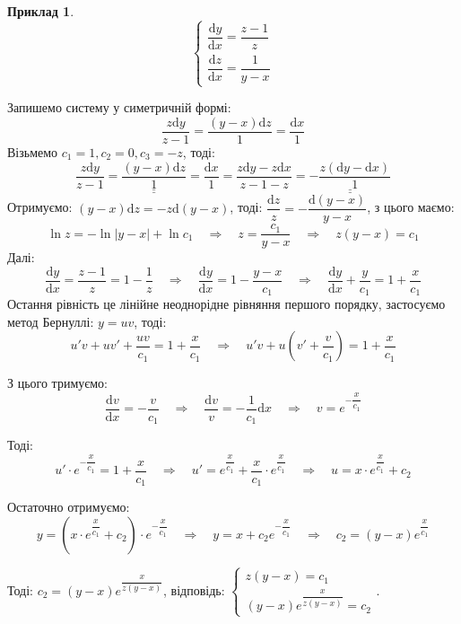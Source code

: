 \documentclass[14pt,a4paper]{scrartcl}
\theoremstyle{definition}
\newtheorem*{example}{Приклад}
\theoremstyle{definition}
\theoremstyle{definition}
\def\doubleunderline#1{\underline{\underline{#1}}}
\begin{document}
\begin{example}
  \begin{equation*}
    \begin{cases}
      \dfrac{\mathrm{d}y}{\mathrm{d}x} = \dfrac{z - 1}{z} \\
      \dfrac{\mathrm{d}z}{\mathrm{d}x} = \dfrac{1}{y - x}
    \end{cases}
  \end{equation*}
\end{example}
Запишемо систему у симетричній формі: $$ \dfrac{z\mathrm{d}y}{z - 1} = \dfrac{(y-x)\mathrm{d}z}{1} = \dfrac{\mathrm{d}x}{1}$$
Візьмемо $c_1 = 1, c_2 = 0, c_3 = -z$, тоді: $$\dfrac{z\mathrm{d}y}{z - 1} = \doubleunderline{\dfrac{(y - x)\mathrm{d}z}{1}} = \dfrac{\mathrm{d}x}{1} = \dfrac{z\mathrm{d}y - z\mathrm{d}x}{z - 1 - z} = \doubleunderline{-\dfrac{z(\mathrm{d}y - \mathrm{d}x)}{1}}$$
Отримуємо: $(y - x)\mathrm{d}z = -z\mathrm{d}(y - x)$, тоді: $\dfrac{\mathrm{d}z}{z} = - \dfrac{\mathrm{d}(y - x)}{y -x}$, з цього маємо: $$ \ln z = - \ln|y - x| + \ln c_1 \quad \Longrightarrow \quad z = \dfrac{c_1}{y - x} \quad \Longrightarrow \quad z (y - x) = c_1$$
Далі: $$ \dfrac{\mathrm{d}y}{\mathrm{d}x} = \dfrac{z - 1}{z} = 1 - \dfrac{1}{z} \quad \Longrightarrow \quad \dfrac{\mathrm{d}y}{\mathrm{d}x} = 1 - \dfrac{y - x}{c_1} \quad \Longrightarrow \quad \dfrac{\mathrm{d}y}{\mathrm{d}x} + \dfrac{y}{c_1} = 1 + \dfrac{x}{c_1}$$
Остання рівність це лінійне неоднорідне рівняння першого порядку, застосуємо метод Бернуллі: $y = uv$, тоді: $$u'v + uv' + \dfrac{uv}{c_1} = 1 + \dfrac{x}{c_1} \quad \Longrightarrow \quad u'v + u(v' + \dfrac{v}{c_1}) = 1 + \dfrac{x}{c_1}$$

З цього тримуємо: $$ \dfrac{\mathrm{d}v}{\mathrm{d}x} = -\dfrac{v}{c_1} \quad \Longrightarrow \quad \dfrac{\mathrm{d}v}{v} = -\dfrac{1}{c_1}\mathrm{d}x \quad \Longrightarrow \quad v = e^{-\dfrac{x}{c_1}}$$

Тоді: $$u' \cdot e^{-\dfrac{x}{c_1}} = 1 + \dfrac{x}{c_1} \quad \Longrightarrow \quad u' = e^{\dfrac{x}{c_1}} + \dfrac{x}{c_1} \cdot e^{\dfrac{x}{c_1}} \quad \Longrightarrow \quad u = x \cdot e^{\dfrac{x}{c_1}} + c_2$$

Остаточно отримуємо:$$ y = (x \cdot e^{\dfrac{x}{c_1}} + c_2) \cdot e^{-\dfrac{x}{c_1}} \quad \Longrightarrow \quad y = x + c_2 e^{-\dfrac{x}{c_1}} \quad \Longrightarrow \quad c_2 = (y - x)e^{\dfrac{x}{c_1}}$$

Тоді: $c_2 = (y - x)e^{\dfrac{x}{z(y - x)}}$, відповідь:
$\begin{cases}
  z(y - x) = c_1 \\
  (y - x)e^{\dfrac{x}{z(y - x)}} = c_2
\end{cases}$.
\end{document}
